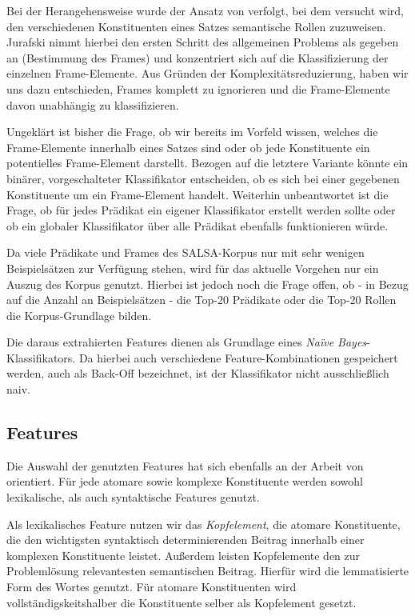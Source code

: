 \documentclass[12pt]{article}
\begin{document}
Bei der Herangehensweise wurde der Ansatz von \cite{gildea} verfolgt, bei dem
versucht wird, den verschiedenen Konstituenten eines Satzes semantische Rollen
zuzuweisen. Jurafski nimmt hierbei den ersten Schritt des allgemeinen Problems
als gegeben an (Bestimmung des Frames) und konzentriert sich auf die
Klassifizierung der einzelnen Frame-Elemente. Aus Gründen der
Komplexitätsreduzierung, haben wir uns dazu entschieden, Frames komplett zu
ignorieren und die Frame-Elemente davon unabhängig zu klassifizieren.

Ungeklärt ist bisher die Frage, ob wir bereits im Vorfeld wissen, welches die
Frame-Elemente innerhalb eines Satzes sind oder ob jede Konstituente ein
potentielles Frame-Element darstellt. Bezogen auf die letztere Variante könnte
ein binärer, vorgeschalteter Klassifikator entscheiden, ob es sich bei einer
gegebenen Konstituente um ein Frame-Element handelt. Weiterhin unbeantwortet ist
die Frage, ob für jedes Prädikat ein eigener Klassifikator erstellt werden
sollte oder ob ein globaler Klassifikator über alle Prädikat ebenfalls
funktionieren würde.

Da viele Prädikate und Frames des SALSA-Korpus nur mit sehr wenigen
Beispielsätzen zur Verfügung stehen, wird für das aktuelle Vorgehen nur ein
Auszug des Korpus genutzt. Hierbei ist jedoch noch die Frage offen, ob - in
Bezug auf die Anzahl an Beispielsätzen - die Top-20 Prädikate oder die Top-20
Rollen die Korpus-Grundlage bilden.

Die daraus extrahierten Features dienen als Grundlage eines
\textit{Naïve Bayes}-Klassifikators. Da hierbei auch verschiedene
Feature-Kombinationen gespeichert werden, auch als \glqq{}Back-Off\grqq{}
bezeichnet, ist der Klassifikator nicht ausschließlich \glqq{}naiv\grqq{}.

 
\subsection{Features}

Die Auswahl der genutzten Features hat sich ebenfalls an der Arbeit von
\cite{gildea} orientiert. Für jede atomare sowie komplexe Konstituente werden
sowohl lexikalische, als auch syntaktische Features genutzt.

Als lexikalisches Feature nutzen wir das \textit{Kopfelement}, die atomare
Konstituente, die den wichtigsten syntaktisch determinierenden Beitrag innerhalb einer
komplexen Konstituente leistet. Außerdem leisten Kopfelemente den zur
Problemlösung relevantesten semantischen Beitrag. Hierfür wird die
lemmatisierte Form des Wortes genutzt. Für atomare Konstituenten wird
vollständigskeitshalber die Konstituente selber als Kopfelement gesetzt.
\end{document}
